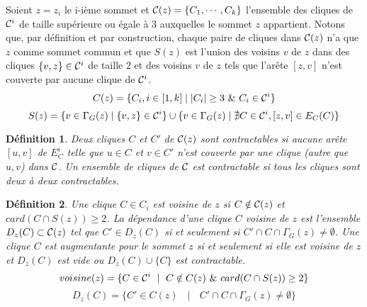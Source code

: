 \documentclass[onecolumn, 12pt]{book}
\newtheorem{definition}{D\'efinition}
\begin{document}
Soient $z=z_i$ le i-i\`eme sommet et ${\cal C}(z) = \{C_1, \cdots, C_k\}$ l'ensemble des cliques de ${\cal C}^i$ de taille sup\'erieure ou \'egale \`a $3$ auxquelles le sommet $z$ appartient.
Notons que, par d\'efinition et par construction, chaque paire de cliques dans ${\cal C}(z)$ n'a que $z$ comme sommet commun et que $S(z)$ est l'union des voisins $v$ de $z$ dans des cliques $\{v,z\} \in {\cal C}^i$ de taille $2$ et des voisins $v$ de $z$ tels que l'ar\^ete $[z,v]$ n'est couverte par aucune clique de ${\cal C}^i$.
\begin{equation}
C(z) = \{C_i, i \in [1,k] \mid  |C_i| \ge 3 \mbox{ } \&  \mbox{ } C_i \in {\cal C}^i \} 
\end{equation}
\begin{equation}
S(z) = \{v \in \Gamma_G(z) \mid \{v,z\} \in {\cal C}^i\} \cup  \{ v \in \Gamma_G(z) \mid \nexists C \in {\cal C}^{i} , [z,v] \in E_C(C) \}
\end{equation}

\begin{definition}
Deux cliques $C$ et $C'$ de ${\cal C}(z)$ sont {\em contractables} si aucune ar\^ete $[u,v]$ de $E_C^i$ telle que $u \in C$ et $v \in C'$ n'est couverte par une clique (autre que ${u,v}$) dans $\cal C$.
Un ensemble de cliques de $\cal C$ est contractable si tous les cliques sont deux \`a deux contractables.
\end{definition}

\begin{definition}
Une clique $C \in C_i$ est {\em voisine} de $z$ si $C \notin {\cal C}(z)$ et $card(C \cap S(z)) \ge 2$.
La d\'ependance d'une clique $C$ voisine de $z$ est l'ensemble $D_z(C) \subset {\cal C}(z)$ tel que $C' \in D_z(C)$ si et seulement si  $C' \cap C \cap \Gamma_{G}(z) \ne \emptyset$.
\newline
Une clique $C$ est {\em augmentante} pour le sommet $z$ si et seulement si elle est voisine de $z$ et  $D_z(C)$ est vide  ou $D_{z}(C) \cup \{C\}$ est contractable.
\begin{equation}
voisine(z) = \{C \in {\cal C}^i \mbox{ } \mid \mbox{ } C \notin C(z) \mbox{ } \& \mbox{ } card(C \cap S(z)) \ge 2 \} \newline
\end{equation}
\begin{equation}
D_{z}(C) = \{ C' \in C(z) \mbox{ } \mid  \mbox{ } C' \cap C \cap \Gamma_{G}(z) \ne \emptyset \}
\end{equation}
\end{definition}
\end{document}
